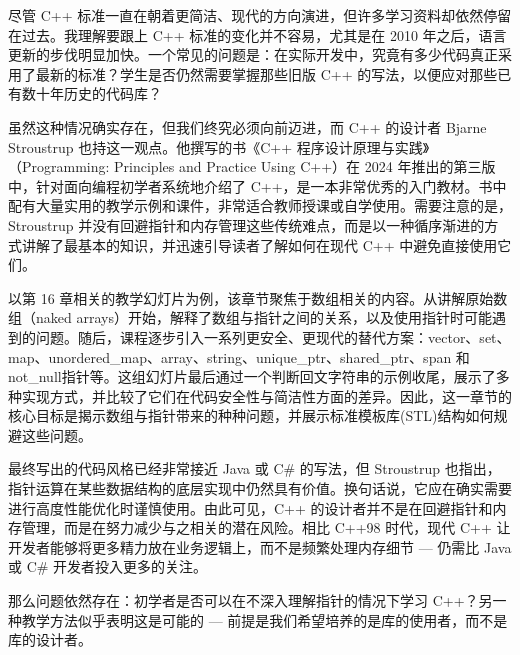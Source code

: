 尽管 C++ 标准一直在朝着更简洁、现代的方向演进，但许多学习资料却依然停留在过去。我理解要跟上 C++ 标准的变化并不容易，尤其是在 2010 年之后，语言更新的步伐明显加快。一个常见的问题是：在实际开发中，究竟有多少代码真正采用了最新的标准？学生是否仍然需要掌握那些旧版 C++ 的写法，以便应对那些已有数十年历史的代码库？

虽然这种情况确实存在，但我们终究必须向前迈进，而 C++ 的设计者 Bjarne Stroustrup 也持这一观点。他撰写的书《C++ 程序设计原理与实践》（Programming: Principles and Practice Using C++）在 2024 年推出的第三版中，针对面向编程初学者系统地介绍了 C++，是一本非常优秀的入门教材。书中配有大量实用的教学示例和课件，非常适合教师授课或自学使用。需要注意的是，Stroustrup 并没有回避指针和内存管理这些传统难点，而是以一种循序渐进的方式讲解了最基本的知识，并迅速引导读者了解如何在现代 C++ 中避免直接使用它们。

以第 16 章相关的教学幻灯片为例，该章节聚焦于数组相关的内容。从讲解原始数组（naked arrays）开始，解释了数组与指针之间的关系，以及使用指针时可能遇到的问题。随后，课程逐步引入一系列更安全、更现代的替代方案：vector、set、map、unordered\_map、array、string、unique\_ptr、shared\_ptr、span 和 not\_null指针等。这组幻灯片最后通过一个判断回文字符串的示例收尾，展示了多种实现方式，并比较了它们在代码安全性与简洁性方面的差异。因此，这一章节的核心目标是揭示数组与指针带来的种种问题，并展示标准模板库(STL)结构如何规避这些问题。

最终写出的代码风格已经非常接近 Java 或 C\# 的写法，但 Stroustrup 也指出，指针运算在某些数据结构的底层实现中仍然具有价值。换句话说，它应在确实需要进行高度性能优化时谨慎使用。由此可见，C++ 的设计者并不是在回避指针和内存管理，而是在努力减少与之相关的潜在风险。相比 C++98 时代，现代 C++ 让开发者能够将更多精力放在业务逻辑上，而不是频繁处理内存细节 --- 仍需比 Java 或 C\# 开发者投入更多的关注。

那么问题依然存在：初学者是否可以在不深入理解指针的情况下学习 C++？另一种教学方法似乎表明这是可能的 --- 前提是我们希望培养的是库的使用者，而不是库的设计者。